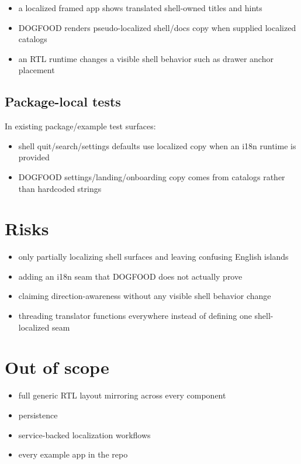 \begin{itemize}
\tightlist
\item
  a localized framed app shows translated shell-owned titles and hints
\item
  DOGFOOD renders pseudo-localized shell/docs copy when supplied localized catalogs
\item
  an RTL runtime changes a visible shell behavior such as drawer anchor placement
\end{itemize}

\subsection{Package-local tests}\label{record-194-package-local-tests}

In existing package/example test surfaces:

\begin{itemize}
\tightlist
\item
  shell quit/search/settings defaults use localized copy when an i18n runtime is provided
\item
  DOGFOOD settings/landing/onboarding copy comes from catalogs rather than hardcoded strings
\end{itemize}

\section{Risks}\label{record-194-risks}

\begin{itemize}
\tightlist
\item
  only partially localizing shell surfaces and leaving confusing English islands
\item
  adding an i18n seam that DOGFOOD does not actually prove
\item
  claiming direction-awareness without any visible shell behavior change
\item
  threading translator functions everywhere instead of defining one shell-localized seam
\end{itemize}

\section{Out of scope}\label{record-194-out-of-scope}

\begin{itemize}
\tightlist
\item
  full generic RTL layout mirroring across every component
\item
  persistence
\item
  service-backed localization workflows
\item
  every example app in the repo
\end{itemize}

